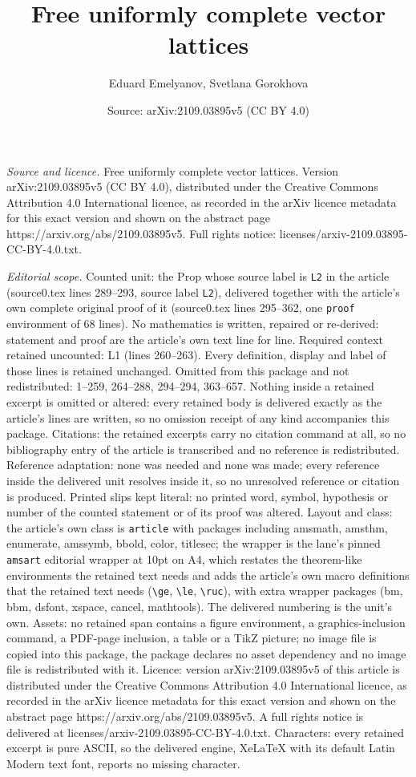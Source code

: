 \documentclass[10pt,a4paper]{amsart}
\title[Free uniformly complete vector lattices]{Free uniformly complete vector lattices}
\author{Eduard Emelyanov, Svetlana Gorokhova}
\date{Source: arXiv:2109.03895v5 (CC BY 4.0)}
\begin{document}
\maketitle

\noindent\emph{Source and licence.} Free uniformly complete vector lattices. Version arXiv:2109.03895v5 (CC BY 4.0), distributed under the Creative Commons Attribution 4.0 International licence, as recorded in the arXiv licence metadata for this exact version and shown on the abstract page https://arxiv.org/abs/2109.03895v5. Full rights notice: licenses/arxiv-2109.03895-CC-BY-4.0.txt.\par\smallskip

\noindent\textit{Editorial scope.} Counted unit: the Prop whose source label is \texttt{L2} in the article (source0.tex lines 289--293, source label \texttt{L2}), delivered together with the article's own complete original proof of it (source0.tex lines 295--362, one \texttt{proof} environment of 68 lines). No mathematics is written, repaired or re-derived: statement and proof are the article's own text line for line. Required context retained uncounted: L1 (lines 260--263). Every definition, display and label of those lines is retained unchanged. Omitted from this package and not redistributed: 1--259, 264--288, 294--294, 363--657. Nothing inside a retained excerpt is omitted or altered: every retained body is delivered exactly as the article's lines are written, so no omission receipt of any kind accompanies this package. Citations: the retained excerpts carry no citation command at all, so no bibliography entry of the article is transcribed and no reference is redistributed. Reference adaptation: none was needed and none was made; every reference inside the delivered unit resolves inside it, so no unresolved reference or citation is produced. Printed slips kept literal: no printed word, symbol, hypothesis or number of the counted statement or of its proof was altered. Layout and class: the article's own class is \texttt{article} with packages including amsmath, amsthm, enumerate, amssymb, bbold, color, titlesec; the wrapper is the lane's pinned \texttt{amsart} editorial wrapper at 10pt on A4, which restates the theorem-like environments the retained text needs and adds the article's own macro definitions that the retained text needs (\texttt{\textbackslash ge}, \texttt{\textbackslash le}, \texttt{\textbackslash ruc}), with extra wrapper packages (bm, bbm, dsfont, xspace, cancel, mathtools). The delivered numbering is the unit's own. Assets: no retained span contains a figure environment, a graphics-inclusion command, a PDF-page inclusion, a table or a TikZ picture; no image file is copied into this package, the package declares no asset dependency and no image file is redistributed with it. Licence: version arXiv:2109.03895v5 of this article is distributed under the Creative Commons Attribution 4.0 International licence, as recorded in the arXiv licence metadata for this exact version and shown on the abstract page https://arxiv.org/abs/2109.03895v5. A full rights notice is delivered at licenses/arxiv-2109.03895-CC-BY-4.0.txt. Characters: every retained excerpt is pure ASCII, so the delivered engine, XeLaTeX with its default Latin Modern text font, reports no missing character.
\end{document}

